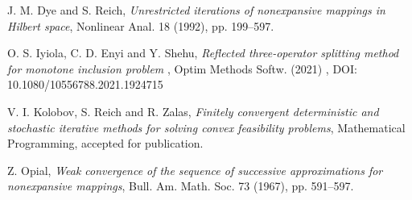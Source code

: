 \documentclass[]{interact}
\theoremstyle{plain}%
\theoremstyle{definition}
\theoremstyle{remark}
\begin{document}
\begin{thebibliography}{99}
J. M. Dye and S. Reich, \emph{Unrestricted iterations of
nonexpansive mappings in Hilbert space}, Nonlinear Anal. 18 (1992),
pp. 199--597.

O. S. Iyiola, C. D. Enyi and Y. Shehu, \emph{Reflected three-operator splitting method for monotone inclusion problem }, Optim Methods Softw. (2021) , DOI: 10.1080/10556788.2021.1924715

V. I. Kolobov, S. Reich and R. Zalas, \emph{Finitely convergent
deterministic and stochastic iterative methods for solving convex
feasibility problems}, Mathematical Programming, accepted for publication.

Z. Opial, \emph{Weak convergence of the sequence of successive
approximations for nonexpansive mappings}, Bull. Am. Math. Soc. 73 (1967),
pp. 591--597.
\end{thebibliography}
\end{document}
